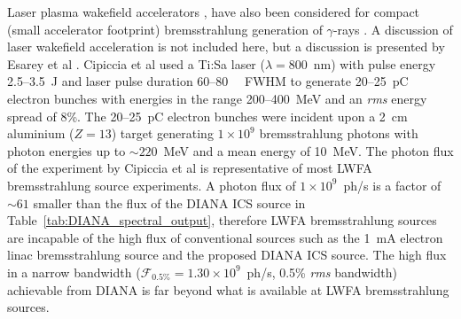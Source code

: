 \documentclass[../main.tex]{subfiles}
\begin{document}

Laser plasma wakefield accelerators \cite{sprangle1988laser,esarey2009physics}, have also been considered for compact (small accelerator footprint) bremsstrahlung generation of $\gamma$-rays \cite{cipiccia2012tuneable,lemos2018bremsstrahlung}. A discussion of laser wakefield acceleration is not included here, but a discussion is presented by Esarey et al \cite{esarey2009physics}. Cipiccia et al \cite{cipiccia2012tuneable} used a Ti:Sa laser ($\lambda = 800$~\si{\nano\meter}) with pulse energy 2.5--3.5~\si{\joule} and laser pulse duration 60--80~\si{\femto\seconds} FWHM to generate 20--25~\si{\pico\coulomb} electron bunches with energies in the range 200--400~\si{\mega\electronvolt} and an \textit{rms} energy spread of 8\%. The 20--25~\si{\pico\coulomb} electron bunches were incident upon a 2~\si{\centi\meter} aluminium ($Z=13$) target generating $1\times 10^{9}$ bremsstrahlung photons with photon energies up to $\sim 220$~\si{\mega\electronvolt} and a mean energy of 10~\si{\mega\electronvolt}. The photon flux of the experiment by Cipiccia et al \cite{cipiccia2012tuneable} is representative of most LWFA bremsstrahlung source experiments. A photon flux of $1\times 10^{9}$~ph/\si{\second} is a factor of $\sim 61$ smaller than the flux of the DIANA ICS source in Table~\ref{tab:DIANA_spectral_output}, therefore LWFA bremsstrahlung sources are incapable of the high flux of conventional sources such as the 1~\si{\milli\ampere} electron linac bremsstrahlung source and the proposed DIANA ICS source. The high flux in a narrow bandwidth ($\mathcal{F}_{\mathrm{0.5\%}} = 1.30\times 10^{9}$~ph/\si{\second}, 0.5\% \textit{rms} bandwidth) achievable from DIANA is far beyond what is available at LWFA bremsstrahlung sources.    
\end{document}
